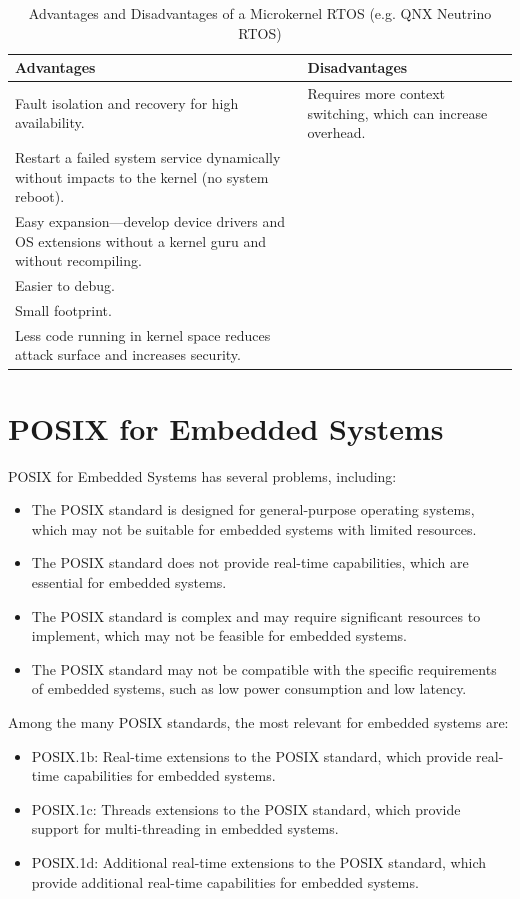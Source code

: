 \documentclass{article}
\begin{document}
\begin{table}[!ht]
    \centering
    \small %
    \begin{tabularx}{\textwidth}{@{}Xl@{}}
        \toprule
        Advantages  & Disadvantages   \\ \midrule
        Fault isolation and recovery for high availability. & Requires more context switching, which can increase overhead. \\ \hline
        Restart a failed system service dynamically without impacts to the kernel (no system reboot). & \\ \hline
        Easy expansion—develop device drivers and OS extensions without a kernel guru and without recompiling. & \\ \hline
        Easier to debug. & \\ \hline
        Small footprint. & \\ \hline
        Less code running in kernel space reduces attack surface and increases security. & \\ \bottomrule
    \end{tabularx}
    \caption{Advantages and Disadvantages of a Microkernel RTOS (e.g. QNX Neutrino RTOS) \cite{WhatsRTOS2024}}
    \label{tab:microkernel-advantages}
\end{table}

\FloatBarrier
\section{POSIX for Embedded Systems}
\label{sec:posix-embedded-systems}
POSIX for Embedded Systems has several problems, including:
\begin{itemize}
    \item  The POSIX standard is designed for general-purpose operating systems, which may not be suitable for embedded systems with limited resources.
    \item  The POSIX standard does not provide real-time capabilities, which are essential for embedded systems.
    \item  The POSIX standard is complex and may require significant resources to implement, which may not be feasible for embedded systems.
    \item  The POSIX standard may not be compatible with the specific requirements of embedded systems, such as low power consumption and low latency.
\end{itemize}
Among the many POSIX standards, the most relevant for embedded systems are:
\begin{itemize}
    \item POSIX.1b: Real-time extensions to the POSIX standard, which provide real-time capabilities for embedded systems.
    \item  POSIX.1c: Threads extensions to the POSIX standard, which provide support for multi-threading in embedded systems.
    \item  POSIX.1d: Additional real-time extensions to the POSIX standard, which provide additional real-time capabilities for embedded systems.
\end{itemize}
\cite{SystemArchitecture}
\end{document}
